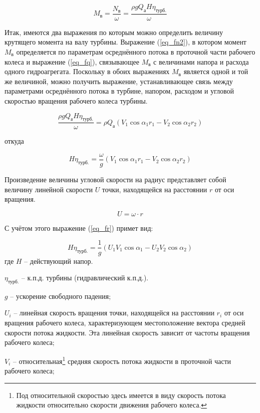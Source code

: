\begin{equation}
\label{eq_fq}
    M_{\text{в}} = \frac{N_{\text{в}}}{\omega} = \frac{\rho g Q_{\text{а}} H \eta_{\text{турб.}}}{\omega} 
\end{equation}

Итак, имеются два выражения по которым можно определить величину крутящего момента на валу турбины. Выражение (\ref{eq_fn2}), в котором момент $ M_{\text{в}} $ определяется по параметрам осреднённого потока в проточной части рабочего колеса и выражение (\ref{eq_fq}), связывающее $ M_{\text{в}} $ с величинами напора и расхода одного гидроагрегата. Поскольку в обоих выражениях $ M_{\text{в}} $ является одной и той же величиной, можно получить выражение, устанавливающее связь между параметрами осреднённого потока в турбине, напором, расходом и угловой скоростью вращения рабочего колеса турбины.

$$
   \frac{\rho g Q_{\text{а}} H \eta_{\text{турб.}}}{\omega} = \rho  Q_{\text{а}}  ( V_1  \cos \alpha_1  r_1 - V_2  \cos \alpha_2  r_2)
$$

откуда

\begin{equation}
\label{eq_fr}
   H \eta_{\text{турб.}} = \frac{\omega}{g} ( V_1  \cos \alpha_1  r_1 - V_2  \cos \alpha_2  r_2 )
\end{equation}

Произведение величины угловой скорости на радиус представляет собой величину линейной скорости $U$ точки, находящейся на расстоянии $r$ от оси вращения.

$$ 
   U = \omega \cdot r
$$ 

С учётом этого выражение (\ref{eq_fr}) примет вид:

\begin{equation}
\label{eq_fs}
  \boxed{ H \eta_{\text{турб.}} = \frac{1}{g} \left( U_1 V_1  \cos \alpha_1 - U_2 V_2  \cos \alpha_2 \right) }
\end{equation}
где $H$ -- действующий напор.

$\eta_{\text{турб.}}$ -- к.п.д. турбины (гидравлический к.п.д.).

$g$ -- ускорение свободного падения;

$U_i$ -- линейная скорость вращения точки, находящейся на расстоянии $r_i$ от оси вращения рабочего колеса, характеризующем местоположение вектора средней скорости потока жидкости. Эта линейная скорость зависит от частоты вращения рабочего колеса;

$V_i$ -- относительная\footnote{Под относительной скоростью здесь имеется в виду скорость потока жидкости относительно скорости движения рабочего колеса.} средняя скорость потока жидкости в проточной части рабочего колеса;


